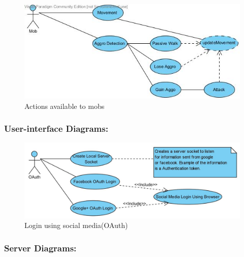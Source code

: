 \documentclass[letterpaper]{article}
\begin{document}
					\begin{figure}[H]
					\centering
					\includegraphics[width=140mm]{UML_Diagram/Use_Case/Mob_Actions.jpg}
					\caption{Actions available to mobs}
					\end{figure}
					
				\vspace{0.2in}
				\subsubsection*{User-interface Diagrams:}
				\vspace{0.2in}
				
				\begin{figure}[H]
					\centering
					\includegraphics[width=140mm]{UML_Diagram/Use_Case/OAuth.jpg}
					\caption{Login using social media(OAuth)}
					\end{figure}
				
				\vspace{0.2in}
				\subsubsection*{Server Diagrams:}
				\vspace{0.2in}
				
\end{document}
